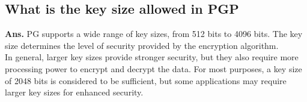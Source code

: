 \documentclass{article}
\begin{document}
\subsection{\textbf{What is the key size allowed in PGP}}
\textbf{Ans.} PG supports a wide range of key sizes, from 512 bits to 4096 bits. The key size determines the level of security provided by the encryption algorithm.\\

In general, larger key sizes provide stronger security, but they also require more processing power to encrypt and decrypt the data. For most purposes, a key size of 2048 bits is considered to be sufficient, but some applications may require larger key sizes for enhanced security.
\end{document}
